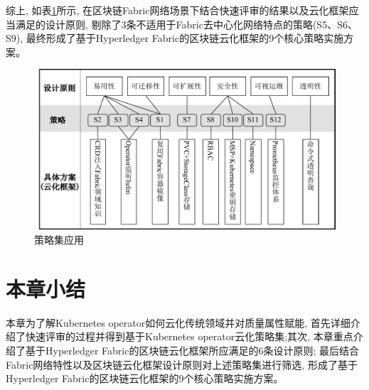 综上, 如表\ref{policy_set_application}所示, 在区块链Fabric网络场景下结合快速评审的结果以及云化框架应当满足的设计原则, 剔除了3条不适用于Fabric去中心化网络特点的策略(S5、S6、S9), 最终形成了基于Hyperledger Fabric的区块链云化框架的9个核心策略实施方案。

\begin{figure}[h] %
    \centering %
    \includegraphics[width=1.0\textwidth]{FIGs/chapter3/policy_characteristics.pdf} %
    \caption{策略集应用} %
    \label{policy_set_application} %
\end{figure}%


\section{本章小结}

本章为了解Kubernetes operator如何云化传统领域并对质量属性赋能, 首先详细介绍了快速评审的过程并得到基于Kubernetes operator云化策略集;其次, 本章重点介绍了基于Hyperledger Fabric的区块链云化框架所应满足的6条设计原则; 最后结合Fabric网络特性以及区块链云化框架设计原则对上述策略集进行筛选, 形成了基于Hyperledger Fabric的区块链云化框架的9个核心策略实施方案。